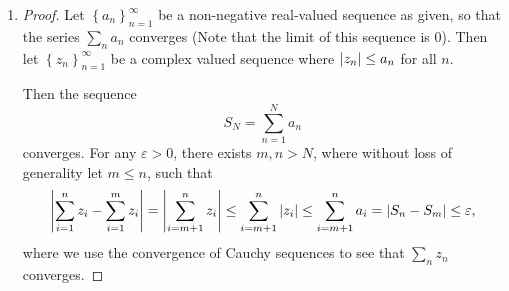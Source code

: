 \documentclass[11pt]{article}
\newcommand{\cbr}[1]{\left\{#1\right\}}
\begin{document}
\begin{enumerate}[label=(\alph*)]
  \item \begin{proof}
    Let $\cbr{a_n}_{n=1}^{\infty}$ be a non-negative real-valued sequence as given, so that the series $\sum_n a_n$ converges (Note that the limit of this sequence is $0$). Then let $\cbr{z_n}_{n=1}^{\infty}$ be a complex valued sequence where $\abs{z_n} \leq a_n$ for all $n$.

    Then the sequence \[S_N = \sum_{n=1}^N a_n\] converges. For any $\varepsilon >0$, there exists $m,n > N$, where without loss of generality let $m\leq n$, such that \[\abs{\sum_{i=1}^n z_i-\sum_{i=1}^m z_i} = \abs{\sum_{i = m+1}^n z_i} \leq \sum_{i=m+1}^n\abs{z_i}\leq \sum_{i=m+1}^n a_i = \abs{S_n-S_m}\leq \varepsilon,\] where we use the convergence of Cauchy sequences to see that $\sum_n z_n$ converges.
  \end{proof}
\end{enumerate}
\end{document}
